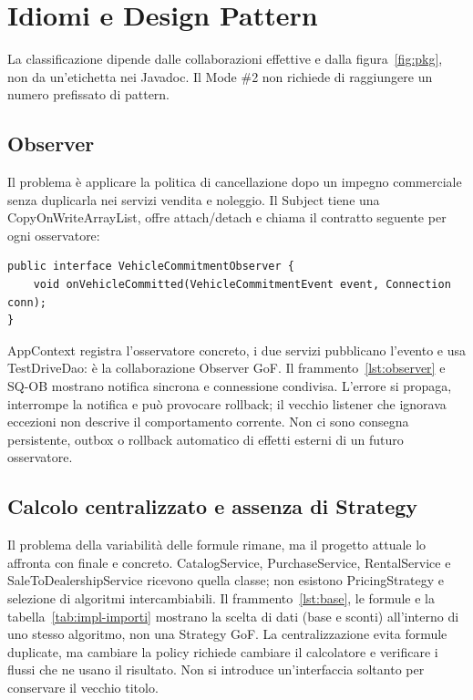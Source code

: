 \section{Idiomi e Design Pattern}\label{sec:impl-pattern}
La classificazione dipende dalle collaborazioni effettive e dalla
figura~\ref{fig:pkg}, non da un'etichetta nei Javadoc. Il Mode \#2
non richiede di raggiungere un numero prefissato di pattern.

\subsection{Observer}
Il problema è applicare la politica di cancellazione dopo un impegno
commerciale senza duplicarla nei servizi vendita e noleggio. Il Subject
 tiene una CopyOnWriteArrayList, offre
attach/detach e chiama il contratto seguente per ogni osservatore:

\noindent\begin{minipage}{\linewidth}
\begin{lstlisting}[firstnumber=6,gobble=0,caption={Contratto Observer completo, senza import e commenti introduttivi.},label=lst:contratto-observer]
public interface VehicleCommitmentObserver {
    void onVehicleCommitted(VehicleCommitmentEvent event, Connection conn);
}
\end{lstlisting}
\end{minipage}

AppContext registra l'osservatore concreto, i due servizi pubblicano
l'evento e  usa TestDriveDao: è la
collaborazione Observer GoF. Il frammento~\ref{lst:observer} e
SQ-OB mostrano notifica sincrona e connessione condivisa. L'errore si
propaga, interrompe la notifica e può provocare rollback; il vecchio
listener che ignorava eccezioni non descrive il comportamento corrente.
Non ci sono consegna persistente, outbox o rollback automatico di effetti
esterni di un futuro osservatore.

\subsection{Calcolo centralizzato e assenza di Strategy}
Il problema della variabilità delle formule rimane, ma il progetto
attuale lo affronta con  finale e concreto.
CatalogService, PurchaseService, RentalService e SaleToDealershipService
ricevono quella classe; non esistono PricingStrategy e selezione di
algoritmi intercambiabili. Il frammento~\ref{lst:base}, le formule e la
tabella~\ref{tab:impl-importi} mostrano la scelta di dati (base e sconti)
all'interno di uno stesso algoritmo, non una Strategy GoF. La centralizzazione
evita formule duplicate, ma cambiare la policy richiede cambiare il
calcolatore e verificare i flussi che ne usano il risultato. Non si
introduce un'interfaccia soltanto per conservare il vecchio titolo.

